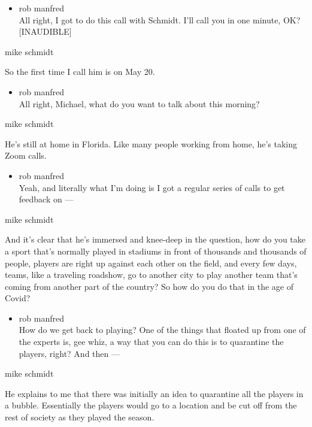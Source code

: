 \begin{itemize}
\tightlist
\item
  rob manfred\\
  All right, I got to do this call with Schmidt. I'll call you in one
  minute, OK? {[}INAUDIBLE{]}
\end{itemize}

mike schmidt

So the first time I call him is on May 20.

\begin{itemize}
\tightlist
\item
  rob manfred\\
  All right, Michael, what do you want to talk about this morning?
\end{itemize}

mike schmidt

He's still at home in Florida. Like many people working from home, he's
taking Zoom calls.

\begin{itemize}
\tightlist
\item
  rob manfred\\
  Yeah, and literally what I'm doing is I got a regular series of calls
  to get feedback on ---
\end{itemize}

mike schmidt

And it's clear that he's immersed and knee-deep in the question, how do
you take a sport that's normally played in stadiums in front of
thousands and thousands of people, players are right up against each
other on the field, and every few days, teams, like a traveling
roadshow, go to another city to play another team that's coming from
another part of the country? So how do you do that in the age of Covid?

\begin{itemize}
\tightlist
\item
  rob manfred\\
  How do we get back to playing? One of the things that floated up from
  one of the experts is, gee whiz, a way that you can do this is to
  quarantine the players, right? And then ---
\end{itemize}

mike schmidt

He explains to me that there was initially an idea to quarantine all the
players in a bubble. Essentially the players would go to a location and
be cut off from the rest of society as they played the season.


